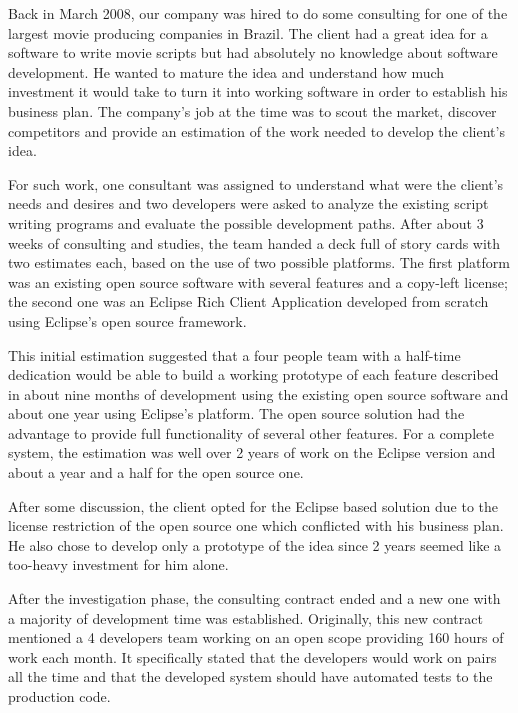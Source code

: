 \documentclass[lnbip]{svmultln}
\begin{document}
Back in March 2008, our company was hired to do some consulting for
one of the largest movie producing companies in Brazil. The client had
a great idea for a software to write movie scripts but had absolutely
no knowledge about software development.  He wanted to mature the idea
and understand how much investment it would take to turn it into
working software in order to establish his business plan. The
company's job at the time was to scout the market, discover
competitors and provide an estimation of the work needed to develop
the client's idea.

For such work, one consultant was assigned to understand what were the
client's needs and desires and two developers were asked to analyze
the existing script writing programs and evaluate the possible
development paths. After about 3 weeks of consulting and studies, the
team handed a deck full of story cards with two estimates each, based
on the use of two possible platforms. The first platform was an
existing open source software with several features and a copy-left
license; the second one was an Eclipse Rich Client Application
developed from scratch using Eclipse's open source framework.

This initial estimation suggested that a four people team with a
half-time dedication would be able to build a working prototype of
each feature described in about nine months of development using the
existing open source software and about one year using Eclipse's
platform. The open source solution had the advantage to provide full
functionality of several other features. For a complete system, the
estimation was well over 2 years of work on the Eclipse version and
about a year and a half for the open source one.

After some discussion, the client opted for the Eclipse based solution
due to the license restriction of the open source one which conflicted
with his business plan. He also chose to develop only a prototype of
the idea since 2 years seemed like a too-heavy investment for him
alone.

After the investigation phase, the consulting contract ended and a new
one with a majority of development time was established. Originally,
this new contract mentioned a 4 developers team working on an open
scope providing 160 hours of work each month. It specifically stated
that the developers would work on pairs all the time and that the
developed system should have automated tests to the production code.

\end{document}
